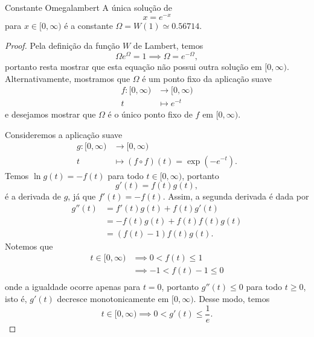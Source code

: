 \begin{proposition}{Constante Omega}{lambert}
    A única solução de
    \begin{equation*}
        x = e^{-x}
    \end{equation*}
    para \(x \in [0,\infty)\) é a constante \(\Omega = W(1) \simeq 0.56714.\)
\end{proposition}
\begin{proof}
    Pela definição da função \(W\) de Lambert, temos
    \begin{equation*}
        \Omega e^\Omega = 1 \implies \Omega = e^{-\Omega},
    \end{equation*}
    portanto resta mostrar que esta equação não possui outra solução em \([0,\infty)\). Alternativamente, mostramos que \(\Omega\) é um ponto fixo da aplicação suave
    \begin{align*}
        f : [0, \infty) &\to [0, \infty)\\
                      t &\mapsto e^{-t}
    \end{align*}
    e desejamos mostrar que \(\Omega\) é o único ponto fixo de \(f\) em \([0,\infty)\).

    Consideremos a aplicação suave
    \begin{align*}
        g : [0, \infty) &\to [0,\infty)\\
                      t &\mapsto (f\circ f)(t) = \exp{\left(-e^{-t}\right)}.
    \end{align*}
    Temos \(\ln{g(t)} = -f(t)\) para todo \(t \in [0,\infty)\), portanto
    \begin{equation*}
        g'(t) = f(t) g(t),
    \end{equation*}
    é a derivada de \(g\), já que \(f'(t) = -f(t)\). Assim, a segunda derivada é dada por
    \begin{align*}
        g''(t) &= f'(t)g(t) + f(t)g'(t)\\
               &= -f(t) g(t) + f(t) f(t) g(t)\\
               &= \left(f(t) - 1\right) f(t) g(t).
    \end{align*}
    Notemos que
    \begin{align*}
        t \in [0, \infty) &\implies 0 < f(t) \leq 1\\
                          &\implies -1 < f(t) - 1 \leq 0\\
    \end{align*}
    onde a igualdade ocorre apenas para \(t = 0\), portanto \(g''(t) \leq 0\) para todo \(t \geq 0\), isto é, \(g'(t)\) decresce monotonicamente em \([0, \infty)\). Desse modo, temos
    \begin{equation*}
        t \in [0, \infty) \implies 0 < g'(t) \leq \frac1e.
    \end{equation*}


\end{proof}
